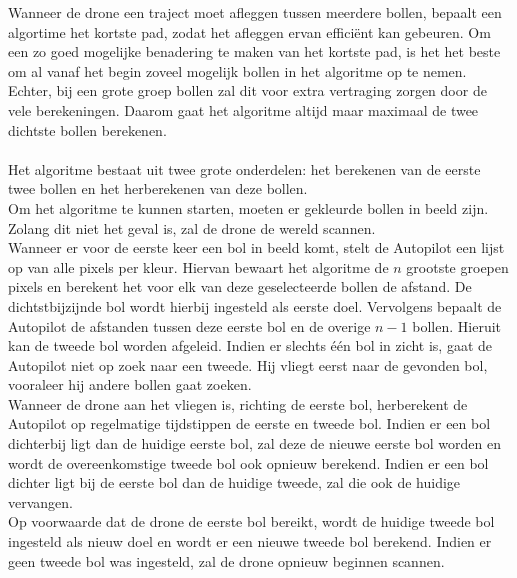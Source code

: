 \noindent
Wanneer de drone een traject moet afleggen tussen meerdere bollen, bepaalt een algortime het kortste pad, zodat het afleggen ervan effici\"ent kan gebeuren. Om een zo goed mogelijke benadering te maken van het kortste pad, is het het beste om al vanaf het begin zoveel mogelijk bollen in het algoritme op te nemen. Echter, bij een grote groep bollen zal dit voor extra vertraging zorgen door de vele berekeningen. Daarom gaat het algoritme altijd maar maximaal de twee dichtste bollen berekenen.
\\
\\
Het algoritme bestaat uit twee grote onderdelen: het berekenen van de eerste twee bollen en het herberekenen van deze bollen.
\\
Om het algoritme te kunnen starten, moeten er gekleurde bollen in beeld zijn. Zolang dit niet het geval is, zal de drone de wereld scannen.
\\
Wanneer er voor de eerste keer een bol in beeld komt, stelt de Autopilot een lijst op van alle pixels per kleur. Hiervan bewaart het algoritme de \(n\) grootste groepen pixels en berekent het voor elk van deze geselecteerde bollen de afstand. De dichtstbijzijnde bol wordt hierbij ingesteld als eerste doel. Vervolgens bepaalt de Autopilot de afstanden tussen deze eerste bol en de overige \(n-1\) bollen. Hieruit kan de tweede bol worden afgeleid. Indien er slechts \'e\'en bol in zicht is, gaat de Autopilot niet op zoek naar een tweede. Hij vliegt eerst naar de gevonden bol, vooraleer hij andere bollen gaat zoeken.
\\
Wanneer de drone aan het vliegen is, richting de eerste bol, herberekent de Autopilot op regelmatige tijdstippen de eerste en tweede bol. Indien er een bol dichterbij ligt dan de huidige eerste bol, zal deze de nieuwe eerste bol worden en wordt de overeenkomstige tweede bol ook opnieuw berekend. Indien er een bol dichter ligt bij de eerste bol dan de huidige tweede, zal die ook de huidige vervangen.
\\
Op voorwaarde dat de drone de eerste bol bereikt, wordt de huidige tweede bol ingesteld als nieuw doel en wordt er een nieuwe tweede bol berekend. Indien er geen tweede bol was ingesteld, zal de drone opnieuw beginnen scannen.